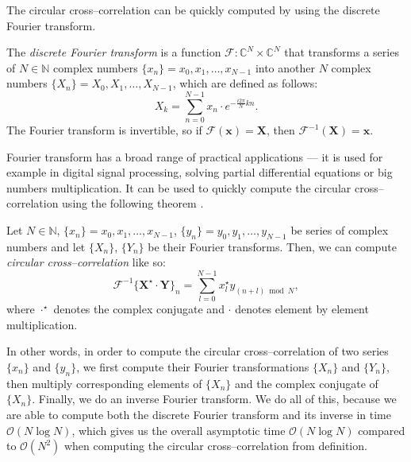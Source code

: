 The circular cross--correlation can be quickly computed by using the discrete Fourier transform.

The \emph{discrete Fourier transform} is a function $\mathcal{F}: \mathbb{C}^N \times \mathbb{C}^N$ that transforms a series of $N \in \mathbb{N}$ complex numbers $\{x_n\} = x_0, x_1, \dots , x_{N-1}$ into another $N$ complex numbers $\{X_n\} = X_0, X_1, \dots , X_{N-1}$, which are defined as follows:
\[
X_k = \sum_{n=0}^{N-1} x_n \cdot e^{-\frac{i2\pi}{N}kn}.
\]
The Fourier transform is invertible, so if $\mathcal{F}(\mathbf{x}) = \mathbf{X}$, then $\mathcal{F}^{-1}(\mathbf{X}) = \mathbf{x}$.

Fourier transform has a broad range of practical applications --- it is used for example in digital signal processing, solving partial differential equations or big numbers multiplication. It can be used to quickly compute the circular cross--correlation using the following theorem \cite{proakis2004digital}.

Let $N \in \mathbb{N}$, $\{x_n\} = x_0, x_1, \dots , x_{N-1}$, $\{y_n\} = y_0, y_1, \dots , y_{N-1}$ be series of complex numbers and let $\{X_n\}$, $\{Y_n\}$ be their Fourier transforms. Then, we can compute \emph{circular cross--correlation} like so: 
\[
\mathcal{F}^{-1}\{\mathbf{X}^\star \cdot \mathbf{Y}\}_n = \sum_{l=0}^{N-1}x^\star_ly_{(n+l)\bmod N},
\]
where $\cdot^\star$ denotes the complex conjugate and $\cdot$ denotes element by element multiplication.

In other words, in order to compute the circular cross--correlation of two series $\{x_n\}$ and $\{y_n\}$, we first compute their Fourier transformations $\{X_n\}$ and $\{Y_n\}$, then multiply corresponding elements of $\{X_n\}$ and the complex conjugate of $\{X_n\}$. Finally, we do an inverse Fourier transform. We do all of this, because we are able to compute both the discrete Fourier transform and its inverse in time $\mathcal{O}(N \log N)$, which gives us the overall asymptotic time $\mathcal{O}(N \log N)$ compared to $\mathcal{O}(N^2)$ when computing the circular cross--correlation from definition.


